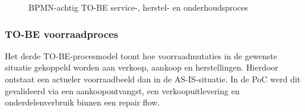 \begin{figure}[H]
\caption{BPMN-achtig TO-BE service-, herstel- en onderhoudsproces}
\label{fig:tobe-service-herstelling}
\end{figure}

\subsubsection{TO-BE voorraadproces}

Het derde TO-BE-procesmodel toont hoe voorraadmutaties in de gewenste situatie gekoppeld worden aan verkoop, aankoop en herstellingen. Hierdoor ontstaat een actueler voorraadbeeld dan in de AS-IS-situatie. In de PoC werd dit gevalideerd via een aankoopontvangst, een verkoopuitlevering en onderdelenverbruik binnen een repair flow.

